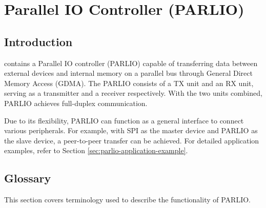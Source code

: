 \documentclass[main\_\_EN.tex]{subfiles}
\begin{document}

\ifglobal
\else
    {\let\clearpage\relax \listoftodos}
    {\let\clearpage\relax \listofdonetodos}
    \tableofcontents
\fi



\hypertarget{parlio}{}
\chapter{Parallel IO Controller (PARLIO)}
\label{mod:parlio}


\section{Introduction}
\chipname{} contains a Parallel IO controller (PARLIO) capable of transferring data between external devices and internal memory on a parallel bus through General Direct Memory Access (GDMA). The PARLIO consists of a TX unit and an RX unit, serving as a transmitter and a receiver respectively. With the two units combined, PARLIO achieves full-duplex communication.

Due to its flexibility, PARLIO can function as a general interface to connect various peripherals. For example, with SPI as the master device and PARLIO as the slave device, a peer-to-peer transfer can be achieved. For detailed application examples, refer to Section \ref{sec:parlio-application-example}.

\section{Glossary}

This section covers terminology used to describe the functionality of PARLIO.
\end{document}

